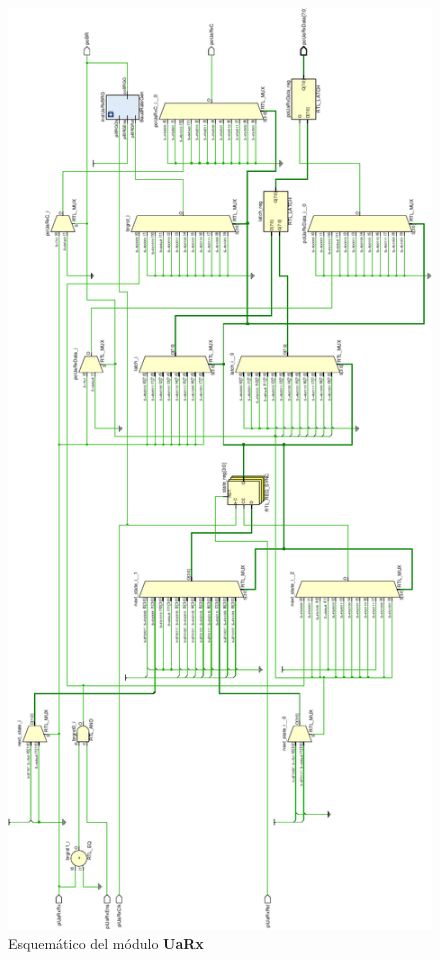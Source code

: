 \documentclass[12pt]{article}
\begin{document}
\begin{figure}[H]
    \centering
    \includegraphics[angle=270, width=\textwidth]{uart-rx-crop}
    \caption{Esquemático del módulo \textbf{UaRx}}
\end{figure}
\end{document}
